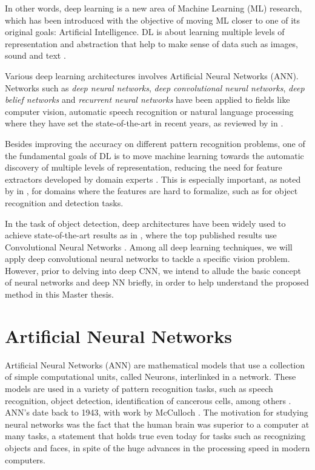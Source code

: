 In other words,  deep learning is a new area of Machine Learning (ML) research, which has been introduced with the objective of moving ML closer to one of its original goals: Artificial Intelligence. DL is about learning multiple levels of representation and abstraction that help to make sense of data such as images, sound and text \cite{tutorial2014lisa}.  

Various deep learning architectures involves Artificial Neural Networks (ANN). Networks such as \textit{deep neural networks}, \textit{deep convolutional neural networks},\textit{ deep belief networks} and \textit{recurrent neural networks} have been applied to fields like computer vision, automatic speech recognition or natural language processing where they have set the state-of-the-art in recent years, as reviewed by \citeauthor{bengio2009learning} in \cite{bengio2009learning, bengio2013deep}. 

Besides improving the accuracy on different pattern recognition problems, one of the fundamental goals of DL is to move machine learning towards the automatic discovery of multiple levels of representation, reducing the need for feature extractors developed by domain experts \cite{bengio2013deep}. This is especially important, as noted by \citeauthor{bengio2009learning} in \cite{bengio2009learning}, for domains where the features are hard to formalize, such as for object recognition and detection tasks.

In the task of object detection, deep architectures have been widely used to achieve state-of-the-art results as in \cite{krizhevsky2009learning,krizhevsky2012imagenet}, where the top published results use Convolutional Neural Networks \cite{ciresan2012multi}. Among all deep learning techniques, we will apply deep convolutional neural networks to tackle a specific vision problem. However, prior to delving into deep CNN, we intend to allude the basic concept of neural networks and deep NN briefly, in order to help understand the proposed method in this Master thesis.

\section{Artificial Neural Networks}

Artificial Neural Networks (ANN) are mathematical models that use a collection of simple computational units, called Neurons, interlinked in a network. These models are used in a variety of pattern recognition tasks, such as speech recognition, object detection, identification of cancerous cells, among others \cite{hertz1991introduction}. ANN's date back to 1943, with work by McCulloch \cite{mcculloch1943logical}. The motivation for studying neural networks was the fact that the human brain was superior to a computer at many tasks, a statement that holds true even today for tasks such as recognizing objects and faces, in spite of the huge advances in the processing speed in modern computers.

